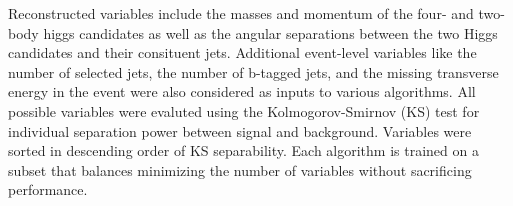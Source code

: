Reconstructed variables include the masses and momentum of the four- and two-body higgs candidates as well as the angular separations between the two Higgs candidates and their consituent jets. Additional event-level variables like the number of selected jets, the number of b-tagged jets, and the missing transverse energy in the event were also considered as inputs to various algorithms. All possible variables were evaluted using the Kolmogorov-Smirnov (KS) test for individual separation power between signal and background. Variables were sorted in descending order of KS separability. Each algorithm is trained on a subset that balances minimizing the number of variables without sacrificing performance. 
